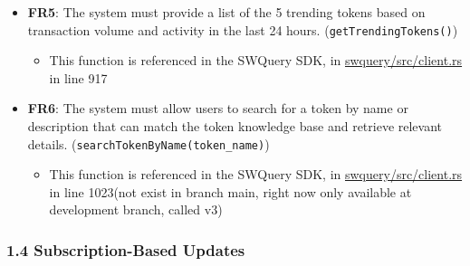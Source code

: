 \documentclass[
]{article}
\providecommand{\tightlist}{%
  \setlength{\itemsep}{0pt}\setlength{\parskip}{0pt}}
\begin{document}
\begin{itemize}
\tightlist
\item
  \textbf{FR5}: The system must provide a list of the 5 trending tokens
  based on transaction volume and activity in the last 24 hours.
  (\texttt{getTrendingTokens()})

  \begin{itemize}
  \tightlist
  \item
    This function is referenced in the SWQuery SDK, in
    \href{https://github.com/SWQuery/swquery/blob/main/swquery/src/client.rs}{swquery/src/client.rs}
    in line 917
  \end{itemize}
\item
  \textbf{FR6}: The system must allow users to search for a token by
  name or description that can match the token knowledge base and
  retrieve relevant details. (\texttt{searchTokenByName(token\_name)})

  \begin{itemize}
  \tightlist
  \item
    This function is referenced in the SWQuery SDK, in
    \href{https://github.com/SWQuery/swquery/blob/main/swquery/src/client.rs}{swquery/src/client.rs}
    in line 1023(not exist in branch main, right now only available at
    development branch, called v3)
  \end{itemize}
\end{itemize}

\hypertarget{subscription-based-updates}{%
\subsubsection{\texorpdfstring{\textbf{1.4 Subscription-Based
Updates}}{1.4 Subscription-Based Updates}}\label{subscription-based-updates}}
\end{document}
